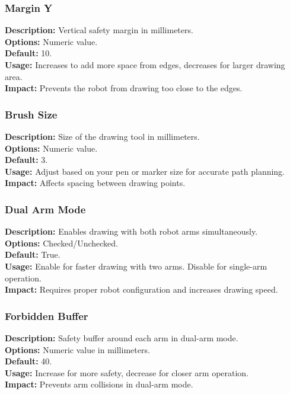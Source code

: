 \documentclass[a4paper,12pt]{article}
\begin{document}
\subsubsection{Margin Y}
\textbf{Description:} Vertical safety margin in millimeters.\\
\textbf{Options:} Numeric value.\\
\textbf{Default:} 10.\\
\textbf{Usage:} Increases to add more space from edges, decreases for larger drawing area.\\
\textbf{Impact:} Prevents the robot from drawing too close to the edges.

\subsubsection{Brush Size}
\textbf{Description:} Size of the drawing tool in millimeters.\\
\textbf{Options:} Numeric value.\\
\textbf{Default:} 3.\\
\textbf{Usage:} Adjust based on your pen or marker size for accurate path planning.\\
\textbf{Impact:} Affects spacing between drawing points.

\subsubsection{Dual Arm Mode}
\textbf{Description:} Enables drawing with both robot arms simultaneously.\\
\textbf{Options:} Checked/Unchecked.\\
\textbf{Default:} True.\\
\textbf{Usage:} Enable for faster drawing with two arms. Disable for single-arm operation.\\
\textbf{Impact:} Requires proper robot configuration and increases drawing speed.

\subsubsection{Forbidden Buffer}
\textbf{Description:} Safety buffer around each arm in dual-arm mode.\\
\textbf{Options:} Numeric value in millimeters.\\
\textbf{Default:} 40.\\
\textbf{Usage:} Increase for more safety, decrease for closer arm operation.\\
\textbf{Impact:} Prevents arm collisions in dual-arm mode.
\end{document}
